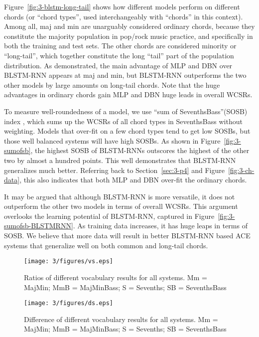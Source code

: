 Figure~\ref{fig:3-blstm-long-tail} shows how different models perform on different chords (or ``chord types'', used interchangeably with ``chords'' in this context). Among all, maj and min are unarguably considered ordinary chords, because they constitute the majority population in pop/rock music practice, and specifically in both the training and test sets. The other chords are considered minority or ``long-tail'', which together constitute the long ``tail'' part of the population distribution. As demonstrated, the main advantage of MLP and DBN over BLSTM-RNN appears at maj and min, but BLSTM-RNN outperforms the two other models by large amounts on long-tail chords. Note that the huge advantages in ordinary chords gain MLP and DBN huge leads in overall WCSRs.

To measure well-roundedness of a model, we use ``sum of SeventhsBass''(SOSB) index \cite{deng2016chord}, which sums up the WCSRs of all chord types in SeventhsBass without weighting. Models that over-fit on a few chord types tend to get low SOSBs, but those well balanced systems will have high SOSBs. As shown in Figure~\ref{fig:3-sumofsb}, the highest SOSB of BLSTM-RNNs outscores the highest of the other two by almost a hundred points. This well demonstrates that BLSTM-RNN generalizes much better. Referring back to Section~\ref{sec:3-p4} and Figure~\ref{fig:3-ch-data}, this also indicates that both MLP and DBN over-fit the ordinary chords.

It may be argued that although BLSTM-RNN is more versatile, it does not outperform the other two models in terms of overall WCSRs. This argument overlooks the learning potential of BLSTM-RNN, captured in Figure~\ref{fig:3-sumofsb-BLSTMRNN}. As training data increases, it has huge leaps in terms of SOSB. We believe that more data will result in better BLSTM-RNN based ACE systems that generalize well on both common and long-tail chords.

 \label{sec:3-p8}

\begin{figure}[htb]
\centering
\texttt{[image: 3/figures/vs.eps]}
\caption{Ratios of different vocabulary results for all systems. Mm = MajMin; MmB = MajMinBass; S = Sevenths; SB = SeventhsBass}
\label{fig:3-vs}
\end{figure}

\begin{figure}[htb]
\centering
\texttt{[image: 3/figures/ds.eps]}
\caption{Difference of different vocabulary results for all systems. Mm = MajMin; MmB = MajMinBass; S = Sevenths; SB = SeventhsBass}
\label{fig:3-ds}
\end{figure}

